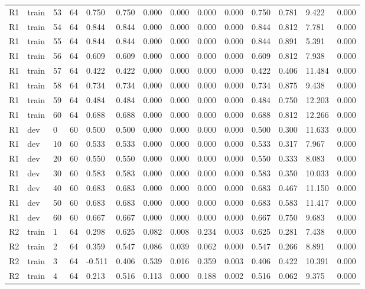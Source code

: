 \begin{table}[t]
\begin{tabular}{llllllllllllll}
R1 & train & 53 & 64 & 0.750 & 0.750 & 0.000 & 0.000 & 0.000 & 0.000 & 0.750 & 0.781 & 9.422 & 0.000 \\
R1 & train & 54 & 64 & 0.844 & 0.844 & 0.000 & 0.000 & 0.000 & 0.000 & 0.844 & 0.812 & 7.781 & 0.000 \\
R1 & train & 55 & 64 & 0.844 & 0.844 & 0.000 & 0.000 & 0.000 & 0.000 & 0.844 & 0.891 & 5.391 & 0.000 \\
R1 & train & 56 & 64 & 0.609 & 0.609 & 0.000 & 0.000 & 0.000 & 0.000 & 0.609 & 0.812 & 7.938 & 0.000 \\
R1 & train & 57 & 64 & 0.422 & 0.422 & 0.000 & 0.000 & 0.000 & 0.000 & 0.422 & 0.406 & 11.484 & 0.000 \\
R1 & train & 58 & 64 & 0.734 & 0.734 & 0.000 & 0.000 & 0.000 & 0.000 & 0.734 & 0.875 & 9.438 & 0.000 \\
R1 & train & 59 & 64 & 0.484 & 0.484 & 0.000 & 0.000 & 0.000 & 0.000 & 0.484 & 0.750 & 12.203 & 0.000 \\
R1 & train & 60 & 64 & 0.688 & 0.688 & 0.000 & 0.000 & 0.000 & 0.000 & 0.688 & 0.812 & 12.266 & 0.000 \\
R1 & dev & 0 & 60 & 0.500 & 0.500 & 0.000 & 0.000 & 0.000 & 0.000 & 0.500 & 0.300 & 11.633 & 0.000 \\
R1 & dev & 10 & 60 & 0.533 & 0.533 & 0.000 & 0.000 & 0.000 & 0.000 & 0.533 & 0.317 & 7.967 & 0.000 \\
R1 & dev & 20 & 60 & 0.550 & 0.550 & 0.000 & 0.000 & 0.000 & 0.000 & 0.550 & 0.333 & 8.083 & 0.000 \\
R1 & dev & 30 & 60 & 0.583 & 0.583 & 0.000 & 0.000 & 0.000 & 0.000 & 0.583 & 0.350 & 10.033 & 0.000 \\
R1 & dev & 40 & 60 & 0.683 & 0.683 & 0.000 & 0.000 & 0.000 & 0.000 & 0.683 & 0.467 & 11.150 & 0.000 \\
R1 & dev & 50 & 60 & 0.683 & 0.683 & 0.000 & 0.000 & 0.000 & 0.000 & 0.683 & 0.583 & 11.417 & 0.000 \\
R1 & dev & 60 & 60 & 0.667 & 0.667 & 0.000 & 0.000 & 0.000 & 0.000 & 0.667 & 0.750 & 9.683 & 0.000 \\
R2 & train & 1 & 64 & 0.298 & 0.625 & 0.082 & 0.008 & 0.234 & 0.003 & 0.625 & 0.281 & 7.438 & 0.000 \\
R2 & train & 2 & 64 & 0.359 & 0.547 & 0.086 & 0.039 & 0.062 & 0.000 & 0.547 & 0.266 & 8.891 & 0.000 \\
R2 & train & 3 & 64 & -0.511 & 0.406 & 0.539 & 0.016 & 0.359 & 0.003 & 0.406 & 0.422 & 10.391 & 0.000 \\
R2 & train & 4 & 64 & 0.213 & 0.516 & 0.113 & 0.000 & 0.188 & 0.002 & 0.516 & 0.062 & 9.375 & 0.000 \\

\end{tabular}
\end{table}
